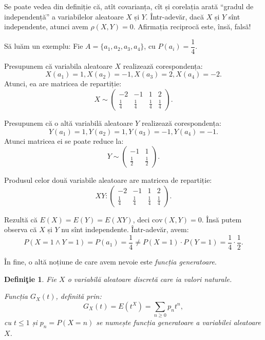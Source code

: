 \documentclass[12pt,a4paper]{article}
\newcommand\qq{\enquote}
\theoremstyle{dotless}
\theoremstyle{dotlessdr}
\newtheorem{definition}{Defini\c{t}ie}
\begin{document}
Se poate vedea din definiție că, atît covarianța, cît și corelația arată \qq{gradul de %
  independență} a variabilelor aleatoare $ X $ și $ Y $. Într-adevăr, dacă $ X $ și $ Y $
sînt independente, atunci avem $ \rho(X, Y) = 0 $. Afirmația reciprocă este, însă, falsă!

Să luăm un exemplu: Fie $ A = \{ a_1, a_2, a_3, a_4 \}$, cu $ P(a_i) = \dfrac{1}{4} $.

Presupunem că variabila aleatoare $ X $ realizează corespondența:
\[
  X(a_1) = 1, X(a_2) = -1, X(a_3) = 2, X(a_4) = -2.
\]
Atunci, ea are matricea de repartiție:
\[
  X \sim
  \begin{pmatrix}
    -2 & -1 & 1 & 2 \\
    \frac{1}{4} & \frac{1}{4} & \frac{1}{4} & \frac{1}{4}
  \end{pmatrix}.
\]

Presupunem că o altă variabilă aleatoare $ Y $ realizează corespondența:
\[
  Y(a_1) = 1, Y(a_2) = 1, Y(a_3) = -1, Y(a_4) = -1.
\]
Atunci matricea ei se poate reduce la:
\[
  Y \sim
  \begin{pmatrix}
    -1 & 1 \\
    \frac{1}{2} & \frac{1}{2}
  \end{pmatrix}.
\]

Produsul celor două variabile aleatoare are matricea de repartiție:
\[
  XY :
  \begin{pmatrix}
    -2 & -1 & 1 & 2 \\
    \frac{1}{4} & \frac{1}{4} & \frac{1}{4} & \frac{1}{4}
  \end{pmatrix}.
\]

Rezultă că $ E(X) = E(Y) = E(XY) $, deci $ \mathrm{cov}(X, Y) = 0 $. Însă putem
observa că $ X $ și $ Y $ nu sînt independente. Într-adevăr, avem:
\[
  P(X = 1 \land Y = 1) = P(a_1) = \frac{1}{4} \neq %
  P(X = 1) \cdot P(Y = 1) = \frac{1}{4} \cdot \frac{1}{2}.
\]

În fine, o altă noțiune de care avem nevoie este \emph{funcția generatoare}.

\begin{definition}\label{def:generatoare}
  Fie $ X $ o variabilă aleatoare discretă care ia valori naturale.

  Funcția $ G_X(t) $, definită prin:
  \[
    G_X(t) = E(t^X) = \sum_{n \geq 0} p_n t^n, 
  \]
  cu $ t \leq 1 $ și $ p_n = P(X = n) $ se numește \emph{funcția generatoare}
  a variabilei aleatoare $ X $.
\end{definition}
\end{document}
